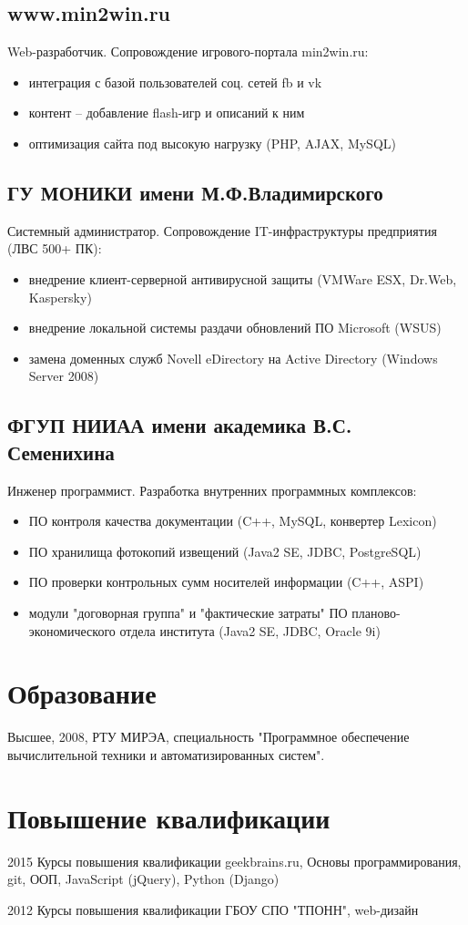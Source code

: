\documentclass[a4paper,12pt]{article}   %
\begin{document}
\subsection*{www.min2win.ru}
Web-разработчик. Сопровождение игрового-портала min2win.ru:
\begin{itemize}
    \item интеграция с базой пользователей соц. сетей fb и vk
    \item контент – добавление flash-игр и описаний к ним
    \item оптимизация сайта под высокую нагрузку (PHP, AJAX, MySQL)
\end{itemize}
\subsection*{ГУ МОНИКИ имени М.Ф.Владимирского}
Системный администратор. Сопровождение IT-инфраструктуры предприятия (ЛВС 500+ ПК):
\begin{itemize}
    \item внедрение клиент-серверной антивирусной защиты (VMWare ESX, Dr.Web, Kaspersky)
    \item внедрение локальной системы раздачи обновлений ПО Microsoft (WSUS)
    \item замена доменных служб Novell eDirectory на Active Directory (Windows Server 2008)
\end{itemize}
\subsection*{ФГУП НИИАА имени академика В.С. Семенихина}
Инженер программист. Разработка внутренних программных комплексов:
\begin{itemize}
    \item ПО контроля качества документации (C++, MySQL, конвертер Lexicon)
    \item ПО хранилища фотокопий извещений (Java2 SE, JDBC, PostgreSQL)
    \item ПО проверки контрольных сумм носителей информации (C++, ASPI)
    \item модули "договорная группа" и "фактические затраты" ПО планово-экономического отдела института (Java2 SE, JDBC, Oracle 9i)
\end{itemize}

\section*{Образование}
Высшее, 2008, РТУ МИРЭА, специальность "Программное обеспечение вычислительной техники и автоматизированных систем".

\section*{Повышение квалификации}

2015 Курсы повышения квалификации geekbrains.ru, Основы программирования, git, ООП, JavaScript (jQuery), Python (Django)

2012 Курсы повышения квалификации ГБОУ СПО "ТПОНН", web-дизайн
\end{document}
